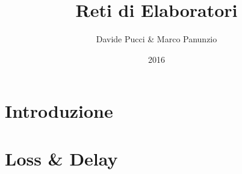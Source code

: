 \documentclass{report}
\title{Reti di Elaboratori}
\author{Davide Pucci \& Marco Panunzio}
\date{2016}
\begin{document}
\maketitle

\tableofcontents

\chapter{Introduzione}


\chapter{Loss \& Delay}

\end{document}
